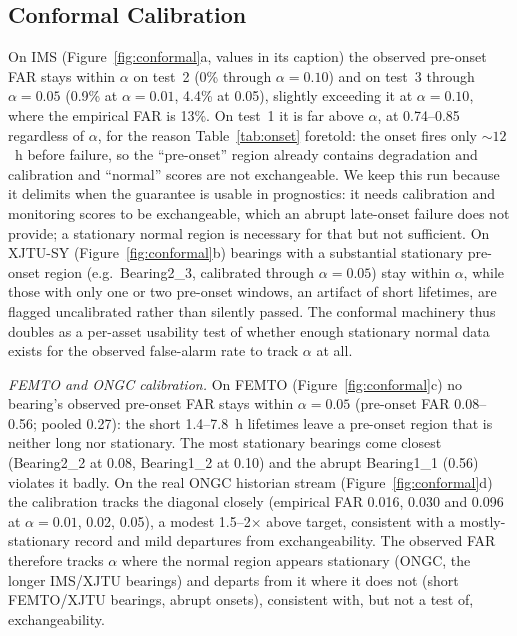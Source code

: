 \documentclass[IJPHM, 2026, 0]{PHMSociety}
\begin{document}


\subsection{Conformal Calibration}
On IMS (Figure~\ref{fig:conformal}a, values in its caption) the observed pre-onset FAR stays within $\alpha$ on test~2 (0\% through $\alpha=0.10$) and on test~3 through $\alpha=0.05$ (0.9\% at $\alpha=0.01$, 4.4\% at 0.05), slightly exceeding it at $\alpha=0.10$, where the empirical FAR is 13\%. On test~1 it is far above $\alpha$, at 0.74--0.85 regardless of $\alpha$, for the reason Table~\ref{tab:onset} foretold: the onset fires only ${\sim}12$~h before failure, so the ``pre-onset'' region already contains degradation and calibration and ``normal'' scores are not exchangeable. We keep this run because it delimits when the guarantee is usable in prognostics: it needs calibration and monitoring scores to be exchangeable, which an abrupt late-onset failure does not provide; a stationary normal region is necessary for that but not sufficient. On XJTU-SY (Figure~\ref{fig:conformal}b) bearings with a substantial stationary pre-onset region (e.g.\ Bearing2\_3, calibrated through $\alpha=0.05$) stay within $\alpha$, while those with only one or two pre-onset windows, an artifact of short lifetimes, are flagged uncalibrated rather than silently passed. The conformal machinery thus doubles as a per-asset usability test of whether enough stationary normal data exists for the observed false-alarm rate to track $\alpha$ at all.

\emph{FEMTO and ONGC calibration.} On FEMTO (Figure~\ref{fig:conformal}c) no bearing's observed pre-onset FAR stays within $\alpha=0.05$ (pre-onset FAR 0.08--0.56; pooled 0.27): the short 1.4--7.8~h lifetimes leave a pre-onset region that is neither long nor stationary. The most stationary bearings come closest (Bearing2\_2 at 0.08, Bearing1\_2 at 0.10) and the abrupt Bearing1\_1 (0.56) violates it badly. On the real ONGC historian stream (Figure~\ref{fig:conformal}d) the calibration tracks the diagonal closely (empirical FAR 0.016, 0.030 and 0.096 at $\alpha=0.01$, 0.02, 0.05), a modest 1.5--2$\times$ above target, consistent with a mostly-stationary record and mild departures from exchangeability. The observed FAR therefore tracks $\alpha$ where the normal region appears stationary (ONGC, the longer IMS/XJTU bearings) and departs from it where it does not (short FEMTO/XJTU bearings, abrupt onsets), consistent with, but not a test of, exchangeability.
\end{document}
